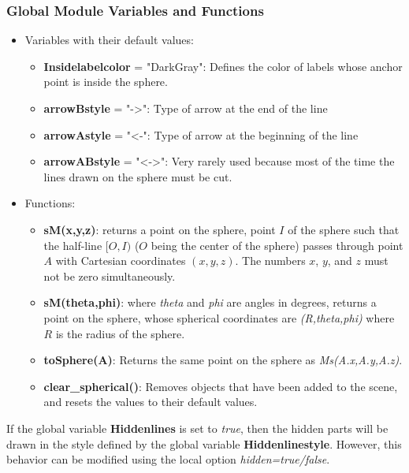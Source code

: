 \subsubsection{Global Module Variables and Functions}

\begin{itemize}
    \item Variables with their default values:
\begin{itemize}
    \item \textbf{Insidelabelcolor} = "DarkGray": Defines the color of labels whose anchor point is inside the sphere.
    \item \textbf{arrowBstyle} = "->": Type of arrow at the end of the line
    \item \textbf{arrowAstyle} = "<-": Type of arrow at the beginning of the line
    \item \textbf{arrowABstyle} = "<->": Very rarely used because most of the time the lines drawn on the sphere must be cut. \end{itemize}
    \item Functions:
\begin{itemize}
    \item \textbf{sM(x,y,z)}: returns a point on the sphere, point $I$ of the sphere such that the half-line $[O,I)$ ($O$ being the center of the sphere) passes through point $A$ with Cartesian coordinates $(x,y,z)$. The numbers $x$, $y$, and $z$ must not be zero simultaneously.
    \item \textbf{sM(theta,phi)}: where \emph{theta} and \emph{phi} are angles in degrees, returns a point on the sphere, whose spherical coordinates are \emph{(R,theta,phi)} where $R$ is the radius of the sphere.     \item \textbf{toSphere(A)}: Returns the same point on the sphere as \emph{Ms(A.x,A.y,A.z)}.
    \item \textbf{clear\_spherical()}: Removes objects that have been added to the scene, and resets the values ​​to their default values.
\end{itemize}
\end{itemize}

If the global variable \textbf{Hiddenlines} is set to \emph{true}, then the hidden parts will be drawn in the style defined by the global variable \textbf{Hiddenlinestyle}. However, this behavior can be modified using the local option \emph{hidden=true/false}.

